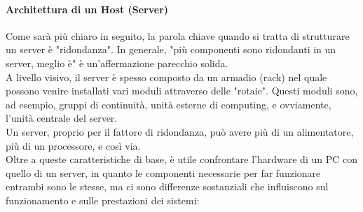 \documentclass[a4paper]{report}
\begin{document}
\paragraph{Architettura di un Host (Server)} Come sarà più chiaro in seguito, la parola chiave quando si tratta di strutturare un server è "ridondanza". In generale, "più componenti sono ridondanti in un server, meglio è" è un'affermazione parecchio solida.\\
A livello visivo, il server è spesso composto da un armadio (rack) nel quale possono venire installati vari moduli attraverso delle "rotaie". Questi moduli sono, ad esempio, gruppi di continuità, unità esterne di computing, e ovviamente, l'unità centrale del server.\\
Un server, proprio per il fattore di ridondanza, può avere più di un alimentatore, più di un processore, e così via.\\
Oltre a queste caratteristiche di base, è utile confrontare l'hardware di un PC con quello di un server, in quanto le componenti necessarie per far funzionare entrambi sono le stesse, ma ci sono differenze sostanziali che influiscono sul funzionamento e sulle prestazioni dei sistemi:
\end{document}
